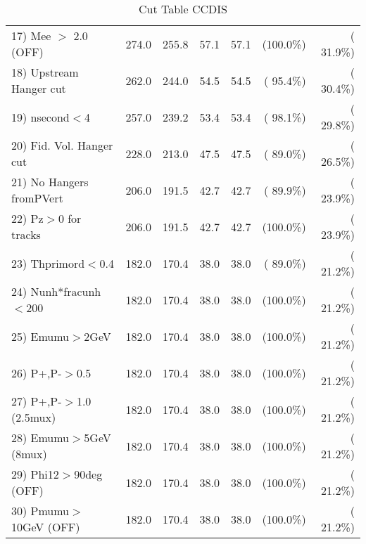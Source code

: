 \begin{table}[h!]
\begin{tabular}{||l||r|r|r|r|r|r||}
 17) Mee $>$ 2.0  (OFF)   &        274.0 &        255.8 &         57.1 &         57.1 & (100.0\%) & ( 31.9\%) \\
 18) Upstream Hanger cut  &        262.0 &        244.0 &         54.5 &         54.5 & ( 95.4\%) & ( 30.4\%) \\
 19) nsecond$<$4          &        257.0 &        239.2 &         53.4 &         53.4 & ( 98.1\%) & ( 29.8\%) \\
 20) Fid. Vol. Hanger cut &        228.0 &        213.0 &         47.5 &         47.5 & ( 89.0\%) & ( 26.5\%) \\
 21) No Hangers fromPVert &        206.0 &        191.5 &         42.7 &         42.7 & ( 89.9\%) & ( 23.9\%) \\
 22) Pz$>$0 for tracks    &        206.0 &        191.5 &         42.7 &         42.7 & (100.0\%) & ( 23.9\%) \\
 23) Thprimord$<$0.4      &        182.0 &        170.4 &         38.0 &         38.0 & ( 89.0\%) & ( 21.2\%) \\
 24) Nunh*fracunh$<$200   &        182.0 &        170.4 &         38.0 &         38.0 & (100.0\%) & ( 21.2\%) \\
 25) Emumu$>$2GeV         &        182.0 &        170.4 &         38.0 &         38.0 & (100.0\%) & ( 21.2\%) \\
 26) P+,P-$>$0.5          &        182.0 &        170.4 &         38.0 &         38.0 & (100.0\%) & ( 21.2\%) \\
 27) P+,P-$>$1.0 (2.5mux) &        182.0 &        170.4 &         38.0 &         38.0 & (100.0\%) & ( 21.2\%) \\
 28) Emumu$>$5GeV  (8mux) &        182.0 &        170.4 &         38.0 &         38.0 & (100.0\%) & ( 21.2\%) \\
 29) Phi12$>$90deg  (OFF) &        182.0 &        170.4 &         38.0 &         38.0 & (100.0\%) & ( 21.2\%) \\
 30) Pmumu$>$10GeV  (OFF) &        182.0 &        170.4 &         38.0 &         38.0 & (100.0\%) & ( 21.2\%) \\
 \hline
 \hline
 \end{tabular}
 \caption{Cut Table  CCDIS    }
 \label{tab-cutcohjpsi-mumu_ncdis}
 \end{table}
